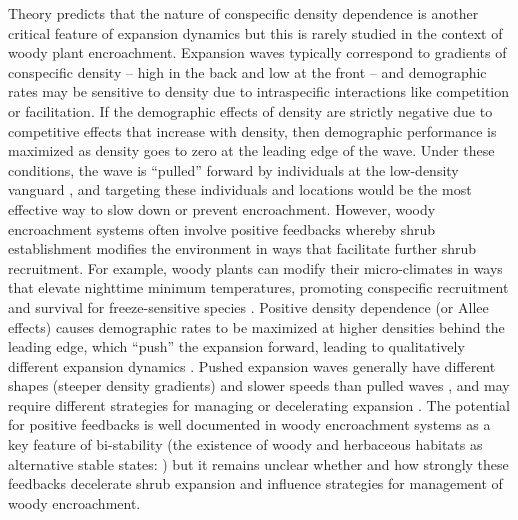 \documentclass[11pt]{article}\usepackage[]{graphicx}\usepackage[]{color}
\begin{document}
Theory predicts that the nature of conspecific density dependence is another critical feature of expansion dynamics but this is rarely studied in the context of woody plant encroachment.  
Expansion waves typically correspond to gradients of conspecific density -- high in the back and low at the front -- and demographic rates may be sensitive to density due to intraspecific interactions like competition or facilitation.
If the demographic effects of density are strictly negative due to competitive effects that increase with density, then demographic performance is maximized as density goes to zero at the leading edge of the wave. 
Under these conditions, the wave is ``pulled'' forward by individuals at the low-density vanguard \citep{kot1996dispersal}, and targeting these individuals and locations would be the most effective way to slow down or prevent encroachment. 
However, woody encroachment systems often involve positive feedbacks whereby shrub establishment modifies the environment in ways that facilitate further shrub recruitment. 
For example, woody plants can modify their micro-climates in ways that elevate nighttime minimum temperatures, promoting conspecific recruitment and survival for freeze-sensitive species \citep{d2013vegetation,huang2020critical}. 
Positive density dependence (or Allee effects) causes demographic rates to be maximized at higher densities behind the leading edge, which ``push'' the expansion forward, leading to qualitatively different expansion dynamics \citep{kot1996dispersal, taylor2005allee, sullivan2017density, lewis1993allee, veit1996dispersal, keitt2001allee}.
Pushed expansion waves generally have different shapes (steeper density gradients) and slower speeds than pulled waves \citep{gandhi2016range}, and may require different strategies for managing or decelerating expansion \citep{taylor2005allee}. 
The potential for positive feedbacks is well documented in woody encroachment systems as a key feature of bi-stability (the existence of woody and herbaceous habitats as alternative stable states: \cite{wilcox2018emerging}) but it remains unclear whether and how strongly these feedbacks decelerate shrub expansion and influence strategies for management of woody encroachment.
\end{document}
